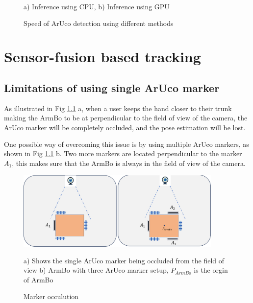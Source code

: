 \documentclass[12pt, twoside]{report}
\begin{document}
\begin{figure}[b!]
    \centering
    \caption{Speed of ArUco detection using different methods}
    {a) Inference using CPU, b) Inference using GPU }
    \label{fig:yolo_speed}
\end{figure}


\chapter{Sensor-fusion based tracking}
\section{Limitations of using single ArUco marker}
As illustrated in Fig \ref{fig:occulution} a, when a user keeps the hand closer to
their trunk making the ArmBo to be at perpendicular to the field of view of the camera,
the ArUco marker will be completely occluded, and the pose estimation will be lost.

One possible way of overcoming this issue is by using multiple ArUco markers,
as shown in Fig \ref{fig:occulution} b. Two more markers are located perpendicular
to the marker $A_1$, this makes sure that the ArmBo is always in the field of view of the camera.

\begin{figure}[H]
    \centering
    \includegraphics[width=0.9\textwidth]{m_occulution_problem.png}
    \caption{Marker occulution}
    {a) Shows the single ArUco marker being occluded from the field of view
        b) ArmBo with three ArUco marker setup, $P_{ArmBo}$ is the orgin of ArmBo}
    \label{fig:occulution}
\end{figure}
\end{document}
